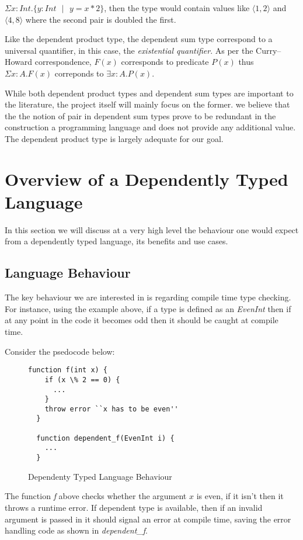 \documentclass[a4paper,12pt]{report}
\begin{document}
$\Sigma x: Int.\{y:Int\text{ }|\text{ } y = x * 2\}$, then the type would 
contain values like $\langle 1,2 \rangle$ and $\langle 4,8 \rangle$ where the 
second pair is doubled the first.

\par
Like the dependent product type, the dependent sum type correspond to a 
universal quantifier, in this case, the \textit{existential quantifier}. As 
per the Curry–Howard correspondence, $F(x)$ corresponds to predicate $P(x)$ 
thus $\Sigma x:A.F(x)$ correponds to $\exists x: A. P(x)$.

\par
While both dependent product types and dependent sum types are important to the 
literature, the project itself will mainly focus on the former. we believe that 
the the notion of pair in dependent sum types prove to be redundant in 
the construction a programming language and does not provide any additional 
value. The dependent product type is largely adequate for our goal.

\section{Overview of a Dependently Typed Language}
In this section we will discuss at a very high level the behaviour one would 
expect from a dependently typed language, its benefits and use cases.

\subsection{Language Behaviour}
The key behaviour we are interested in is regarding compile time type checking. 
For instance, using the example above, if a type is defined as an \textit{EvenInt} 
then if at any point in the code it becomes odd then it should be caught at 
compile time. 

\par
Consider the psedocode below: 
\begin{figure}[H]
  \begin{lstlisting}[mathescape=true] 
  function f(int x) {
    if (x \% 2 == 0) {
      ...
    }
    throw error ``x has to be even''
  }
  
  function dependent_f(EvenInt i) {
    ...
  }
  \end{lstlisting}
  \caption{Dependenty Typed Language Behaviour}
\end{figure}

\par
The function \textit{f} above checks whether the argument $x$ is even, if it 
isn't then it throws a runtime error. If dependent type is available, then if an 
invalid argument is passed in it should signal an error at compile time, saving the 
error handling code as shown in \textit{dependent\_f}. 
\end{document}
